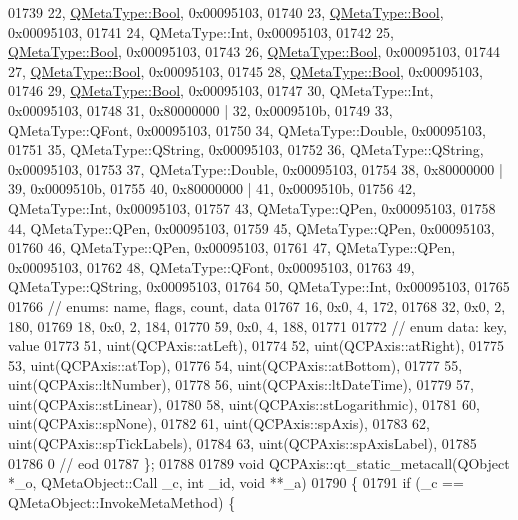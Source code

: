 \begin{DoxyCode}
01739       22, \hyperlink{a00001_a76a8b016e5ad61faf9062cc387df5016}{QMetaType::Bool}, 0x00095103,
01740       23, \hyperlink{a00001_a76a8b016e5ad61faf9062cc387df5016}{QMetaType::Bool}, 0x00095103,
01741       24, QMetaType::Int, 0x00095103,
01742       25, \hyperlink{a00001_a76a8b016e5ad61faf9062cc387df5016}{QMetaType::Bool}, 0x00095103,
01743       26, \hyperlink{a00001_a76a8b016e5ad61faf9062cc387df5016}{QMetaType::Bool}, 0x00095103,
01744       27, \hyperlink{a00001_a76a8b016e5ad61faf9062cc387df5016}{QMetaType::Bool}, 0x00095103,
01745       28, \hyperlink{a00001_a76a8b016e5ad61faf9062cc387df5016}{QMetaType::Bool}, 0x00095103,
01746       29, \hyperlink{a00001_a76a8b016e5ad61faf9062cc387df5016}{QMetaType::Bool}, 0x00095103,
01747       30, QMetaType::Int, 0x00095103,
01748       31, 0x80000000 | 32, 0x0009510b,
01749       33, QMetaType::QFont, 0x00095103,
01750       34, QMetaType::Double, 0x00095103,
01751       35, QMetaType::QString, 0x00095103,
01752       36, QMetaType::QString, 0x00095103,
01753       37, QMetaType::Double, 0x00095103,
01754       38, 0x80000000 | 39, 0x0009510b,
01755       40, 0x80000000 | 41, 0x0009510b,
01756       42, QMetaType::Int, 0x00095103,
01757       43, QMetaType::QPen, 0x00095103,
01758       44, QMetaType::QPen, 0x00095103,
01759       45, QMetaType::QPen, 0x00095103,
01760       46, QMetaType::QPen, 0x00095103,
01761       47, QMetaType::QPen, 0x00095103,
01762       48, QMetaType::QFont, 0x00095103,
01763       49, QMetaType::QString, 0x00095103,
01764       50, QMetaType::Int, 0x00095103,
01765 
01766  \textcolor{comment}{// enums: name, flags, count, data}
01767       16, 0x0,    4,  172,
01768       32, 0x0,    2,  180,
01769       18, 0x0,    2,  184,
01770       59, 0x0,    4,  188,
01771 
01772  \textcolor{comment}{// enum data: key, value}
01773       51, uint(QCPAxis::atLeft),
01774       52, uint(QCPAxis::atRight),
01775       53, uint(QCPAxis::atTop),
01776       54, uint(QCPAxis::atBottom),
01777       55, uint(QCPAxis::ltNumber),
01778       56, uint(QCPAxis::ltDateTime),
01779       57, uint(QCPAxis::stLinear),
01780       58, uint(QCPAxis::stLogarithmic),
01781       60, uint(QCPAxis::spNone),
01782       61, uint(QCPAxis::spAxis),
01783       62, uint(QCPAxis::spTickLabels),
01784       63, uint(QCPAxis::spAxisLabel),
01785 
01786        0        \textcolor{comment}{// eod}
01787 \};
01788 
01789 \textcolor{keywordtype}{void} QCPAxis::qt\_static\_metacall(QObject *\_o, QMetaObject::Call \_c, \textcolor{keywordtype}{int} \_id, \textcolor{keywordtype}{void} **\_a)
01790 \{
01791     \textcolor{keywordflow}{if} (\_c == QMetaObject::InvokeMetaMethod) \{

\end{DoxyCode}
